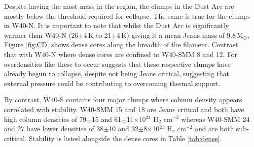 Despite having the most mass in the region, the clumps in the Dust Arc are mostly below 
the threshold required for collapse. The same is true for the clumps in W40-N. It is 
important to note that whilst the Dust Arc is significantly warmer than W40-N (26$\pm$4\,K 
to 21$\pm$4\,K) giving it a mean Jeans mass of 9.8\,M$_{\odot}$, Figure \ref{fig:CD} 
shows dense cores along the breadth of the filament. Contrast that with W40-N where 
dense cores are confined to W40-SMM 8 and 12. For overdensities like these to occur 
suggests that these respective clumps have already begun to collapse, despite not being 
Jeans critical, suggesting that external pressure could be contributing to overcoming 
thermal support. 

By contrast, W40-S contains four major clumps where column density appears correlated 
with stability. W40-SMM 15 and 18 are Jeans critical and both have high column densities 
of 79$\pm$15 and 61$\pm$11$\times$10$^{21}$ H$_{\mathrm{2}}$ cm$^{-2}$ whereas 
W40-SMM 24 and 27 have lower densities of 38$\pm$10 and 32$\pm$8$\times$10$^{21}$ 
H$_{\mathrm{2}}$ cm$^{-2}$ and are both sub-critical. Stability is listed alongside the dense 
cores in Table \ref{tab:dense}. 

